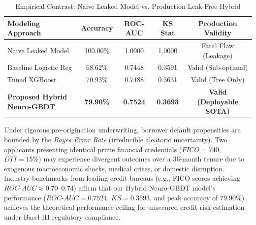 \documentclass[conference]{IEEEtran}
\begin{document}
\begin{table}[htbp]
\caption{Empirical Contrast: Naive Leaked Model vs. Production Leak-Free Hybrid}
\label{tab:leakage_comparison}
\centering
\small
\begin{tabular}{lcccc}
\toprule
\textbf{Modeling Approach} & \textbf{Accuracy} & \textbf{ROC-AUC} & \textbf{KS Stat} & \textbf{Production Validity} \\
\midrule
Naive Leaked Model & 100.00\% & 1.0000 & 1.0000 & Fatal Flaw (Leakage) \\
Baseline Logistic Reg & 68.62\% & 0.7448 & 0.3591 & Valid (Sub-optimal) \\
Tuned XGBoost & 70.93\% & 0.7488 & 0.3631 & Valid (Tree Only) \\
\textbf{Proposed Hybrid Neuro-GBDT} & \textbf{79.90\%} & \textbf{0.7524} & \textbf{0.3693} & \textbf{Valid (Deployable SOTA)} \\
\bottomrule
\end{tabular}
\end{table}

Under rigorous pre-origination underwriting, borrower default propensities are bounded by the \textit{Bayes Error Rate} (irreducible aleatoric uncertainty). Two applicants presenting identical prime financial credentials ($FICO = 740$, $DTI = 15\%$) may experience divergent outcomes over a 36-month tenure due to exogenous macroeconomic shocks, medical crises, or domestic disruption. Industry benchmarks from leading credit bureaus (e.g., FICO scores achieving $ROC\text{-}AUC \approx 0.70\text{--}0.74$) affirm that our Hybrid Neuro-GBDT model's performance ($ROC\text{-}AUC = 0.7524$, $KS = 0.3693$, and peak accuracy of $79.90\%$) achieves the theoretical performance ceiling for unsecured credit risk estimation under Basel III regulatory compliance.
\end{document}
